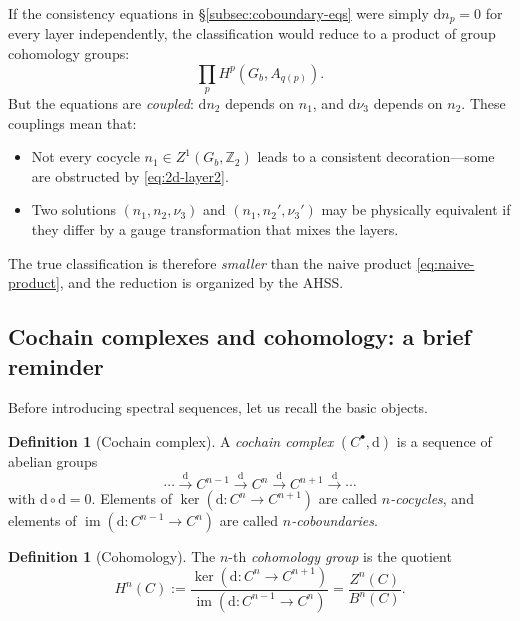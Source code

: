 \documentclass{SciPost}
\theoremstyle{definition}
\newtheorem{definition}[theorem]{Definition}
\newcommand{\Zt}{\mathbb{Z}_2}
\newcommand{\Gb}{G_b}
\newcommand{\dd}{\mathrm{d}}
\renewcommand{\im}{\operatorname{im}}
\begin{document}
If the consistency equations in \S\ref{subsec:coboundary-eqs} were simply $\dd n_p = 0$ for every layer independently, the classification would reduce to a product of group cohomology groups:
\begin{equation}
\label{eq:naive-product}
\prod_{p} H^p(\Gb, A_{q(p)}).
\end{equation}
But the equations are \emph{coupled}: $\dd n_2$ depends on $n_1$, and $\dd \nu_3$ depends on $n_2$.
These couplings mean that:
\begin{itemize}
    \item Not every cocycle $n_1 \in Z^1(\Gb, \Zt)$ leads to a consistent decoration---some are obstructed by \eqref{eq:2d-layer2}.
    \item Two solutions $(n_1, n_2, \nu_3)$ and $(n_1, n_2', \nu_3')$ may be physically equivalent if they differ by a gauge transformation that mixes the layers.
\end{itemize}
The true classification is therefore \emph{smaller} than the naive product \eqref{eq:naive-product}, and the reduction is organized by the AHSS.

\subsection{Cochain complexes and cohomology: a brief reminder}
\label{subsec:cochain-reminder}

Before introducing spectral sequences, let us recall the basic objects.

\begin{definition}[Cochain complex]
A \emph{cochain complex} $(C^\bullet, \dd)$ is a sequence of abelian groups
\begin{equation}
\cdots \xrightarrow{\dd} C^{n-1} \xrightarrow{\dd} C^n \xrightarrow{\dd} C^{n+1} \xrightarrow{\dd} \cdots
\end{equation}
with $\dd \circ \dd = 0$.
Elements of $\ker(\dd: C^n \to C^{n+1})$ are called \emph{$n$-cocycles}, and elements of $\im(\dd: C^{n-1} \to C^n)$ are called \emph{$n$-coboundaries}.
\end{definition}

\begin{definition}[Cohomology]
The $n$-th \emph{cohomology group} is the quotient
\begin{equation}
H^n(C) := \frac{\ker(\dd: C^n \to C^{n+1})}{\im(\dd: C^{n-1} \to C^n)} = \frac{Z^n(C)}{B^n(C)}.
\end{equation}
\end{definition}
\end{document}
